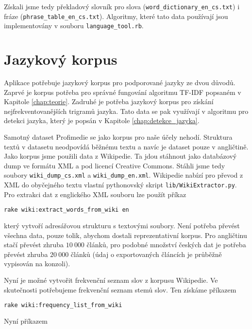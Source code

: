 Získali jsme tedy překladový slovník pro slova (\lstinline{word_dictionary_en_cs.txt}) i fráze (\lstinline{phrase_table_en_cs.txt}). Algoritmy, které tato data používají jsou implementovány v souboru \lstinline{language_tool.rb}.

\section{Jazykový korpus}
\label{subsec:zprovozneni_korpus}

Aplikace potřebuje jazykový korpus pro podporované jazyky ze dvou důvodů. Zaprvé je korpus potřeba pro správné fungování algoritmu TF-IDF popsaném v Kapitole \ref{chap:teorie}. Zadruhé je potřeba jazykový korpus pro získání nejfrekventovanějších trigramů jazyka. Tato data se pak využívají v algoritmu pro detekci jazyka, který je popsán v Kapitole \ref{chap:detekce_jazyka}.



Samotný dataset Profimedie se jako korpus pro naše účely nehodí. Struktura textů v datasetu neodpovídá běžnému textu a navíc je dataset pouze v angličtině. Jako korpus jsme použili data z Wikipedie. Ta jdou stáhnout jako databázový dump ve formátu XML a pod licencí Creative Commons. Stáhli jsme tedy soubory \lstinline{wiki_dump_cs.xml} a \lstinline{wiki_dump_en.xml}. Wikipedie nabízí pro převod z XML do obyčejného textu vlastní pythonovský skript \lstinline{lib/WikiExtractor.py}\cite{wikiextractor}. Pro extrakci dat z englického XML souboru lze použít příkaz

\begin{lstlisting}
rake wiki:extract_words_from_wiki en
\end{lstlisting}

který vytvoří adresářovou strukturu s textovými soubory. Není potřeba převést všechna data, pouze tolik, abychom dostali reprezentativní korpus. Pro angličtinu stačí převést zhruba $10\ 000$ článků, pro podobné množství českých dat je potřeba převést zhruba $20\ 000$ článků (údaj o exportovaných článcích je průběžně vypisován na konzoli).

Nyní je možné vytvořit frekvenční seznam slov z korpusu Wikipedie. Ve skutečnosti potřebujeme frekvenční seznam stemů slov. Ten získáme příkazem

\begin{lstlisting}
rake wiki:frequency_list_from_wiki
\end{lstlisting}

Nyní příkazem

